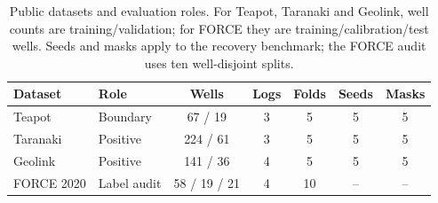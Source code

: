 \begin{table}
\caption{Public datasets and evaluation roles. For Teapot, Taranaki and Geolink,
well counts are training/validation; for FORCE they are
training/calibration/test wells. Seeds and masks apply to the recovery benchmark;
the FORCE audit uses ten well-disjoint splits.}
\label{tab:data}
\centering
\footnotesize
\begin{tabular*}{\textwidth}{@{\extracolsep{\fill}}llccccc@{}}
\toprule
Dataset & Role & Wells & Logs & Folds & Seeds & Masks \\
\midrule
Teapot & Boundary & 67 / 19 & 3 & 5 & 5 & 5 \\
Taranaki & Positive & 224 / 61 & 3 & 5 & 5 & 5 \\
Geolink & Positive & 141 / 36 & 4 & 5 & 5 & 5 \\
FORCE 2020 & Label audit & 58 / 19 / 21 & 4 & 10 & -- & -- \\
\bottomrule
\end{tabular*}
\end{table}
